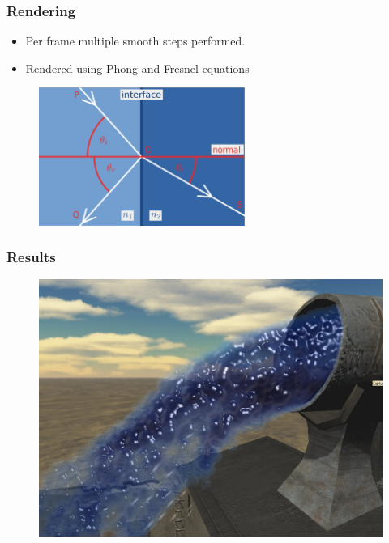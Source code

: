 \documentclass{beamer}
\begin{document}
	\begin{frame}[t]\frametitle{Rendering}
	    \begin{itemize}
	    	\item Per frame multiple smooth steps performed.
	    	\item Rendered using Phong and Fresnel equations
	    \end{itemize}
	    \begin{figure}
			\centering
			\includegraphics[width=0.6\textwidth]{Fresnel.eps}
		\end{figure}
	
	\end{frame}
	\begin{frame}[t]\frametitle{Results}
		\begin{figure}
			\centering
		    \includegraphics[width=.8\textwidth]{gaussian.png}
		\end{figure}
	\end{frame}
\end{document}
